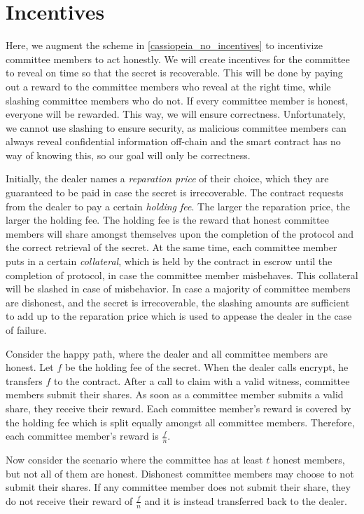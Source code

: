 \section{Incentives}
Here, we augment the scheme in \ref{cassiopeia_no_incentives} to incentivize committee members to act honestly.
We will create incentives for the committee to reveal on time so that the secret is recoverable.
This will be done by paying out a reward to the committee members who reveal at the right time, while slashing committee members who do not.
If every committee member is honest, everyone will be rewarded.
This way, we will ensure correctness.
Unfortunately, we cannot use slashing to ensure security, as malicious committee members can always reveal confidential information off-chain and the smart contract has no way of knowing this, so our goal will only be correctness.

Initially, the dealer names a \emph{reparation price} of their choice, which they are guaranteed to be paid in case the secret is irrecoverable.
The contract requests from the dealer to pay a certain \emph{holding fee}.
The larger the reparation price, the larger the holding fee. 
The holding fee is the reward that honest committee members will share amongst themselves upon the completion of the protocol and the correct retrieval of the secret.
At the same time, each committee member puts in a certain \emph{collateral}, which is held by the contract in escrow until the completion of protocol, in case the committee member misbehaves.
This collateral will be slashed in case of misbehavior.
In case a majority of committee members are dishonest, and the secret is irrecoverable, the slashing amounts are sufficient to add up to the reparation price which is used to appease the dealer in the case of failure.

Consider the happy path, where the dealer and all committee members are honest.
Let $f$ be the holding fee of the secret.
When the dealer calls \textsf{encrypt}, he transfers $f$ to the contract.
After a call to \textsf{claim} with a valid witness, committee members submit their shares.
As soon as a committee member submits a valid share, they receive their reward.
Each committee member's reward is covered by the holding fee which is split equally amongst all committee members.
Therefore, each committee member's reward is $\frac{f}{n}$.

Now consider the scenario where the committee has at least $t$ honest members, but not all of them are honest.
Dishonest committee members may choose to not submit their shares.
If any committee member does not submit their share, they do not receive their reward of $\frac{f}{n}$ and it is instead transferred back to the dealer.

